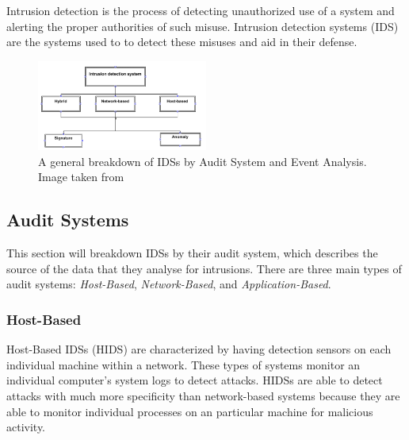 \documentclass{acm_proc_article-sp}
\begin{document}
	Intrusion detection is the process of detecting unauthorized use of a system and alerting the proper authorities of such misuse. Intrusion detection systems (IDS) are the systems used to to detect these misuses and aid in their defense. 
	\begin{figure}[h!]
		\centering
		\includegraphics[width=0.5\textwidth]{idsBreakdown.png}
		\caption{A general breakdown of IDSs by Audit System and Event Analysis. Image taken from \cite{Alenezi2012}}
		\label{breakdown}
	\end{figure}

    \subsection{Audit Systems}
    	This section will breakdown IDSs by their audit system, which describes the source of the data that they analyse for intrusions. There are three main types of audit systems: \emph{Host-Based}, \emph{Network-Based}, and \emph{Application-Based}.
    	\subsubsection{Host-Based} %
    		Host-Based IDSs (HIDS) are characterized by having detection sensors on each individual machine within a network. These types of systems monitor an individual computer's system logs to detect attacks. HIDSs are able to detect attacks with much more specificity than network-based systems because they are able to monitor individual processes on an particular machine for malicious activity. 
    		
\end{document}
